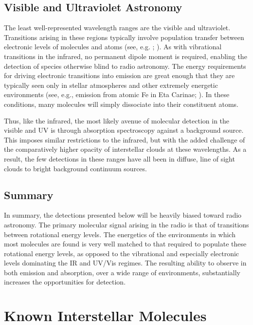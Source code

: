 \documentclass[twocolumn]{aastex631}
\begin{document}
\subsection{Visible and Ultraviolet Astronomy}
\label{detecting:uvvis}

The least well-represented wavelength ranges are the visible and ultraviolet.  Transitions arising in these regions typically involve population transfer between electronic levels of molecules and atoms (see, e.g. ; \citealt{Lofthus:1977jw}).  As with vibrational transitions in the infrared, no permanent dipole moment is required, enabling the detection of species otherwise blind to radio astronomy.  The energy requirements for driving electronic transitions into emission are great enough that they are typically seen only in stellar atmospheres and other extremely energetic environments (see, e.g., emission from atomic Fe in Eta Carinae; \citealt{Aller:1966fs}).  In these conditions, many molecules will simply dissociate into their constituent atoms.

Thus, like the infrared, the most likely avenue of molecular detection in the visible and UV is through absorption spectroscopy against a background source.  This imposes similar restrictions to the infrared, but with the added challenge of the comparatively higher opacity of interstellar clouds at these wavelengths.  As a result, the few detections in these ranges have all been in diffuse, line of sight clouds to bright background continuum sources.

\subsection{Summary}
\label{detecting:summary}

In summary, the detections presented below will be heavily biased toward radio astronomy.  The primary molecular signal arising in the radio is that of transitions between rotational energy levels.  The energetics of the environments in which most molecules are found is very well matched to that required to populate these rotational energy levels, as opposed to the vibrational and especially electronic levels dominating the IR and UV/Vis regimes.  The resulting ability to observe in both emission and absorption, over a wide range of environments, substantially increases the opportunities for detection.

\section{Known Interstellar Molecules}
\label{known}
\end{document}
